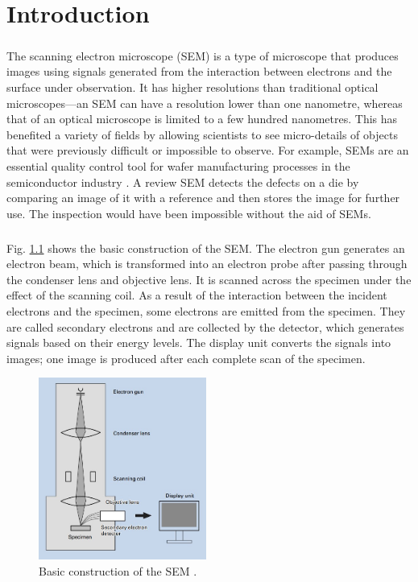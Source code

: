\documentclass[12pt, twocolumn]{report}
\begin{document}
\chapter{Introduction}
\paragraph{}
The scanning electron microscope (SEM) is a type of microscope that produces images using signals generated from the interaction between electrons and the surface under observation. It has higher resolutions than traditional optical microscopes---an SEM can have a resolution lower than one nanometre, whereas that of an optical microscope is limited to a few hundred nanometres. This has benefited a variety of fields by allowing scientists to see micro-details of objects that were previously difficult or impossible to observe. For example, SEMs are an essential quality control tool for wafer manufacturing processes in the semiconductor industry \cite{SEM for semiconductor inspection}. A review SEM detects the defects on a die by comparing an image of it with a reference and then stores the image for further use. The inspection would have been impossible without the aid of SEMs.

\paragraph{}
Fig. \ref{SEM basic construction} shows the basic construction of the SEM. The electron gun generates an electron beam, which is transformed into an electron probe after passing through the condenser lens and objective lens. It is scanned across the specimen under the effect of the scanning coil. As a result of the interaction between the incident electrons and the specimen, some electrons are emitted from the specimen. They are called secondary electrons and are collected by the detector, which generates signals based on their energy levels. The display unit converts the signals into images; one image is produced after each complete scan of the specimen.

\begin{figure}[htbp]
    \centering
    \includegraphics[width=0.49\textwidth]{Figures/SEM basic construction.jpg}
    \caption{Basic construction of the SEM \cite{SEM A to Z}.}
    \label{SEM basic construction}
\end{figure}
\end{document}
